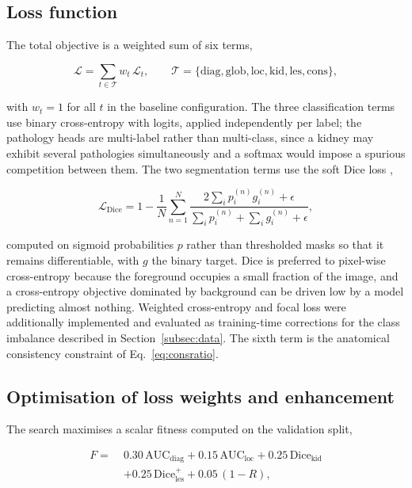 \documentclass[pdflatex,sn-mathphys-num]{sn-jnl}
\theoremstyle{thmstyleone}%
\theoremstyle{thmstyletwo}%
\theoremstyle{thmstylethree}%
\begin{document}
\subsection{Loss function}\label{subsec:loss}

The total objective is a weighted sum of six terms,

\begin{equation}
\mathcal{L} = \sum_{t \in \mathcal{T}} w_t \, \mathcal{L}_t, \qquad
\mathcal{T} = \{\text{diag}, \text{glob}, \text{loc}, \text{kid}, \text{les}, \text{cons}\},
\label{eq:totalloss}
\end{equation}

with $w_t = 1$ for all $t$ in the baseline configuration. The three classification terms use
binary cross-entropy with logits, applied independently per label; the pathology heads are
multi-label rather than multi-class, since a kidney may exhibit several pathologies
simultaneously and a softmax would impose a spurious competition between them. The two
segmentation terms use the soft Dice loss \cite{bib_vnet},

\begin{equation}
\mathcal{L}_{\text{Dice}} = 1 - \frac{1}{N}\sum_{n=1}^{N}
  \frac{2\sum_{i} p^{(n)}_i g^{(n)}_i + \epsilon}
       {\sum_{i} p^{(n)}_i + \sum_{i} g^{(n)}_i + \epsilon},
\label{eq:dice}
\end{equation}

computed on sigmoid probabilities $p$ rather than thresholded masks so that it remains
differentiable, with $g$ the binary target. Dice is preferred to pixel-wise cross-entropy
because the foreground occupies a small fraction of the image, and a cross-entropy objective
dominated by background can be driven low by a model predicting almost nothing. Weighted
cross-entropy and focal loss \cite{bib_focal} were additionally implemented and evaluated as
training-time corrections for the class imbalance described in Section~\ref{subsec:data}. The
sixth term is the anatomical consistency constraint of Eq.~\eqref{eq:consratio}.

\subsection{Optimisation of loss weights and enhancement}\label{subsec:fitness}

The search maximises a scalar fitness computed on the validation split,

\begin{align}
F = \;& 0.30\,\mathrm{AUC}_{\text{diag}} + 0.15\,\mathrm{AUC}_{\text{loc}}
      + 0.25\,\mathrm{Dice}_{\text{kid}} \nonumber\\
      &+ 0.25\,\mathrm{Dice}^{+}_{\text{les}} + 0.05\,(1 - R),
\label{eq:fitness}
\end{align}
\end{document}
